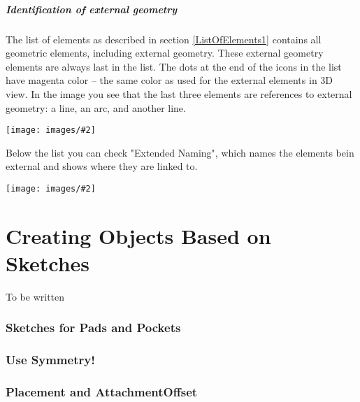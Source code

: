 \documentclass[12pt,titlepage]{article}
\newcommand{\img}[2]{\vspace{2ex}\noindent\texttt{[image: images/\#2]}}
\let\partOrigin\part
\renewcommand\part{\newpage\partOrigin}
\begin{document}
\subsubsection*{Identification of external geometry} The list of elements as described in section \ref{ListOfElements1}  contains all geometric elements, including external geometry. These external geometry elements are always last in the list. The dots at the end of the icons in the list have magenta color -- the same color as used for the external elements in 3D view. In the image you see that the last three elements are references to external geometry: a line, an arc, and another line.

\img{scale=0.8}{ExternalListOfElements}


Below the list you can check "Extended Naming", which names the elements bein external and shows where they are linked to.

\img{scale=0.8}{ExternalListOfElementsExtended}

\newpage \part{Creating Objects Based on Sketches} %


To be written

\section{Sketches for Pads and Pockets} \section{Use Symmetry!} \section{Placement and AttachmentOffset} \label{SketchPlacement}
\end{document}
